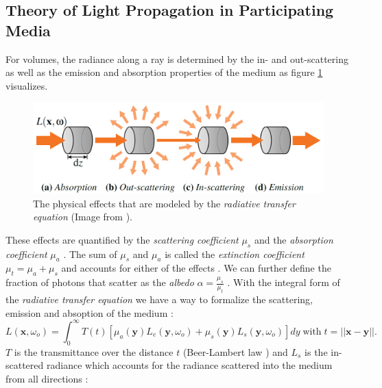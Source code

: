 \subsection{Theory of Light Propagation in Participating Media}
\label{subsec:theory_of_light_propagation_in_participating_media}
For volumes, the radiance along a ray is determined by the in- and out-scattering as well as the emission and absorption properties of the medium as figure \ref{fig:novak_volume_effects} visualizes\cite{novak_overview}.
\begin{figure}[ht]
    \centering
    \includegraphics[width=0.8\linewidth]{img/novak_volume_effects.png}
    \caption{The physical effects that are modeled by the \textit{radiative transfer equation} (Image from \cite{novak_overview}).}
    \label{fig:novak_volume_effects}
\end{figure}
These effects are quantified by the \textit{scattering coefficient} $\mu_s$ and the \textit{absorption coefficient} $\mu_a$ \cite{novak_overview}.
The sum of $\mu_s$ and $\mu_a$ is called the \textit{extinction coefficient} $\mu_t=\mu_a + \mu_s$ and accounts for either of the effects \cite{novak_overview}.
We can further define the fraction of photons that scatter as the \textit{albedo} $\alpha=\frac{\mu_s}{\mu_t}$ \cite{novak_overview}.
With the integral form of the \textit{radiative transfer equation} we have a way to formalize the scattering, emission and absoption of the medium \cite{novak_overview}:
\begin{equation}
    \label{eq:radiative_transfer}
    L(\boldsymbol{x}, \omega_o) = \int_0^\infty T(t)[\mu_a(\boldsymbol{y})L_e(\boldsymbol{y}, \omega_o) + \mu_s(\boldsymbol{y})L_s(\boldsymbol{y}, \omega_o)]dy \;\text{with}\; t=||\boldsymbol{x}-\boldsymbol{y}||.
\end{equation}
$T$ is the transmittance over the distance $t$ (Beer-Lambert law \cite{lambert}) and $L_s$ is the in-scattered radiance which accounts for the radiance scattered into the medium from all directions \cite[p. 3]{novak_overview}:
